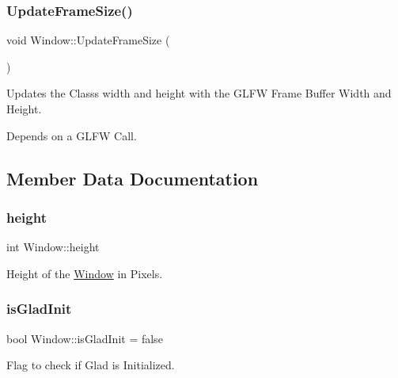 \mbox{\label{class_window_ac825ddc0aeda29fae94c5fc910f3f04d}} 
\subsubsection{\texorpdfstring{Update\+Frame\+Size()}{UpdateFrameSize()}}
{\footnotesize\ttfamily void Window\+::\+Update\+Frame\+Size (\begin{DoxyParamCaption}{ }\end{DoxyParamCaption})}



Updates the Class\textquotesingle{}s width and height with the G\+L\+FW Frame Buffer Width and Height. 

Depends on a G\+L\+FW Call. 

\subsection{Member Data Documentation}
\mbox{\label{class_window_af0ac1732ca6b79a6f6b78aa344140514}} 
\subsubsection{\texorpdfstring{height}{height}}
{\footnotesize\ttfamily int Window\+::height\hspace{0.3cm}{\ttfamily [protected]}}



Height of the \mbox{\hyperlink{class_window}{Window}} in Pixels. 

\mbox{\label{class_window_a7a64d5cb08cc14d5d87cb4efa03fcb92}} 
\subsubsection{\texorpdfstring{is\+Glad\+Init}{isGladInit}}
{\footnotesize\ttfamily bool Window\+::is\+Glad\+Init = false\hspace{0.3cm}{\ttfamily [protected]}}



Flag to check if Glad is Initialized. 

